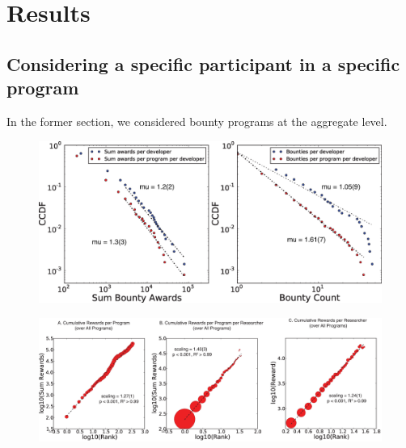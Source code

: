 \section{Results}
\label{sec:results}



\subsection{Considering a specific participant in a specific program}
In the former section, we considered bounty programs at the aggregate level.




\begin{figure}
\begin{center}
\includegraphics[width=12cm]{figures/CCDF_count_Bounties.eps}
\caption{}
\label{ }
\end{center}
\end{figure}


\begin{figure}
\begin{center}
\includegraphics[width=16cm]{figures/scalings.eps}
\caption{}
\label{ }
\end{center}
\end{figure}
